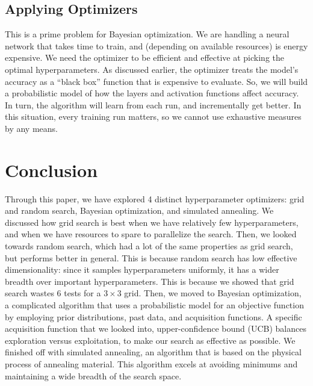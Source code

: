 \documentclass[stu,12pt,floatsintext]{apa7}
\begin{document}
\subsection{Applying Optimizers}

This is a prime problem for Bayesian optimization. We are handling a neural network that takes time to train, and (depending on available resources) is energy expensive. We need the optimizer to be efficient and effective at picking the optimal hyperparameters. As discussed earlier, the optimizer treats the model's accuracy as a ``black box'' function that is expensive to evaluate. So, we will build a probabilistic model of how the layers and activation functions affect accuracy. In turn, the algorithm will learn from each run, and incrementally get better. In this situation, every training run matters, so we cannot use exhaustive measures by any means. 

\section{Conclusion}

Through this paper, we have explored 4 distinct hyperparameter optimizers: grid and random search, Bayesian optimization, and simulated annealing. We discussed how grid search is best when we have relatively few hyperparameters, and when we have resources to spare to parallelize the search. Then, we looked towards random search, which had a lot of the same properties as grid search, but performs better in general. This is because random search has low effective dimensionality: since it samples hyperparameters uniformly, it has a wider breadth over important hyperparameters. This is because we showed that grid search wastes 6 tests for a \(3 \times 3\) grid. Then, we moved to Bayesian optimization, a complicated algorithm that uses a probabilistic model for an objective function by employing prior distributions, past data, and acquisition functions. A specific acquisition function that we looked into, upper-confidence bound (UCB) balances exploration versus exploitation, to make our search as effective as possible. We finished off with simulated annealing, an algorithm that is based on the physical process of annealing material. This algorithm excels at avoiding minimums and maintaining a wide breadth of the search space. 
\end{document}
